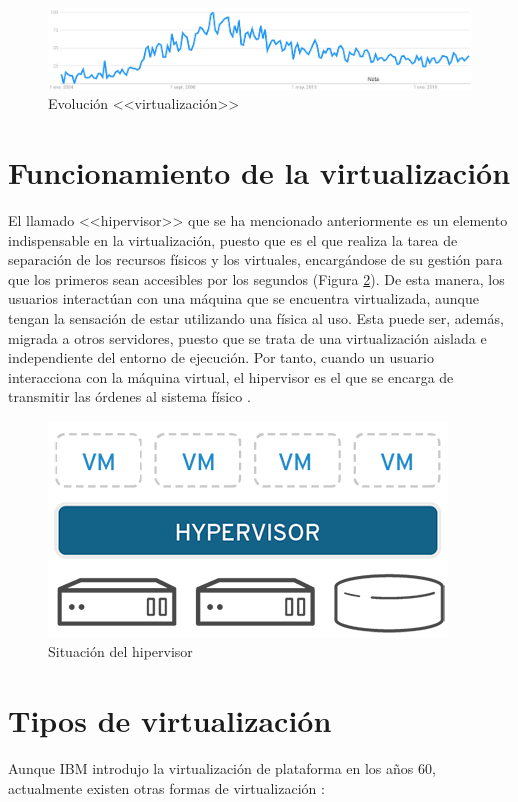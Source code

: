 \begin{figure}[h]
  \centering
  \includegraphics[width=0.9\linewidth]{figures/images/evo_virt.PNG}
  \caption{Evolución <<virtualización>>}
  \label{fig:evo_virt}
\end{figure}

\clearpage

\section{Funcionamiento de la virtualización}
El llamado <<hipervisor>> que se ha mencionado anteriormente es un elemento indispensable en la virtualización, puesto que es el que realiza la tarea de separación de los recursos físicos y los virtuales, encargándose de su gestión para que los primeros sean accesibles por los segundos (Figura \ref{fig:hipervisor}). De esta manera, los usuarios interactúan con una máquina que se encuentra virtualizada, aunque tengan la sensación de estar utilizando una física al uso. Esta puede ser, además, migrada a otros servidores, puesto que se trata de una virtualización aislada e independiente del entorno de ejecución. Por tanto, cuando un usuario interacciona con la máquina virtual, el hipervisor es el que se encarga de transmitir las órdenes al sistema físico \cite{redhat}.

\begin{figure}[h]
  \centering
  \includegraphics[width=0.32\linewidth]{figures/images/hipervisor.png}
  \caption{Situación del hipervisor}
  \label{fig:hipervisor}
\end{figure}

\section{Tipos de virtualización}
Aunque IBM introdujo la virtualización de plataforma en los años 60, actualmente existen otras formas de virtualización \cite{redhat}:

